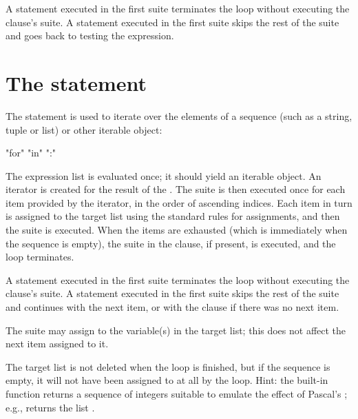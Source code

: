 A  statement executed in the first suite terminates the
loop without executing the  clause's suite.  A
 statement executed in the first suite skips the rest
of the suite and goes back to testing the expression.


\section{The  statement\label{for}}

The  statement is used to iterate over the elements of a
sequence (such as a string, tuple or list) or other iterable object:

\begin{productionlist}
             {"for"  "in" 
              ":" }
\end{productionlist}

The expression list is evaluated once; it should yield an iterable
object.  An iterator is created for the result of the
{}.  The suite is then executed once for each
item provided by the iterator, in the
order of ascending indices.  Each item in turn is assigned to the
target list using the standard rules for assignments, and then the
suite is executed.  When the items are exhausted (which is immediately
when the sequence is empty), the suite in the  clause, if
present, is executed, and the loop terminates.

A  statement executed in the first suite terminates the
loop without executing the  clause's suite.  A
 statement executed in the first suite skips the rest
of the suite and continues with the next item, or with the 
clause if there was no next item.

The suite may assign to the variable(s) in the target list; this does
not affect the next item assigned to it.

The target list is not deleted when the loop is finished, but if the
sequence is empty, it will not have been assigned to at all by the
loop.  Hint: the built-in function  returns a
sequence of integers suitable to emulate the effect of Pascal's
;
e.g.,  returns the list \code{[0, 1, 2]}.

